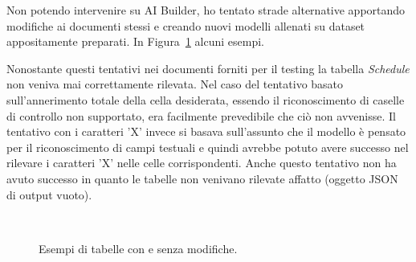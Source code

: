 Non potendo intervenire su AI Builder, ho tentato strade alternative apportando modifiche ai documenti stessi e creando nuovi modelli allenati su dataset appositamente preparati. In Figura~\ref{fig:tabelleConSenzaMod} alcuni esempi.

Nonostante questi tentativi nei documenti forniti per il testing la tabella \textit{Schedule} non veniva mai correttamente rilevata. Nel caso del tentativo basato sull'annerimento totale della cella desiderata, essendo il riconoscimento di caselle di controllo non supportato, era facilmente prevedibile che ciò non avvenisse.
Il tentativo con i caratteri 'X' invece si basava sull'assunto che il modello è pensato per il riconoscimento di campi testuali e quindi avrebbe potuto avere successo nel rilevare i caratteri 'X' nelle celle corrispondenti. Anche questo tentativo non ha avuto successo in quanto le tabelle non venivano rilevate affatto (oggetto JSON di output vuoto).

\begin{figure}
  \centering
   \quad
   \\
     \quad
  \caption{Esempi di tabelle con e senza modifiche.}
  \label{fig:tabelleConSenzaMod}
\end{figure}

